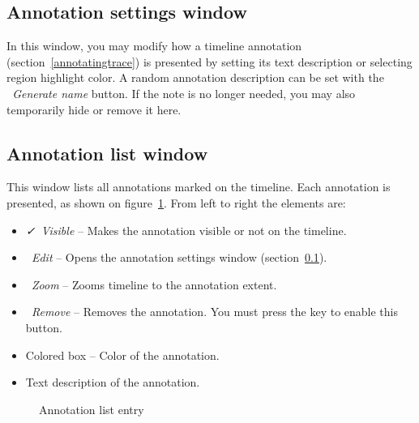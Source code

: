 \documentclass[hidelinks,titlepage,a4paper,twoside]{article}
\begin{document}
\subsection{Annotation settings window}
\label{annotationsettings}

In this window, you may modify how a timeline annotation (section~\ref{annotatingtrace}) is presented by setting its text description or selecting region highlight color. A random annotation description can be set with the \emph{\faDice{}~Generate name} button. If the note is no longer needed, you may also temporarily hide or remove it here.

\subsection{Annotation list window}
\label{annotationlist}

This window lists all annotations marked on the timeline. Each annotation is presented, as shown on figure~\ref{figannlist}. From left to right the elements are:

\begin{itemize}
\item \emph{\faCheck{}~Visible} -- Makes the annotation visible or not on the timeline.
\item \emph{\faPenToSquare{}~Edit} -- Opens the annotation settings window (section~\ref{annotationsettings}).
\item \emph{\faMicroscope{}~Zoom} -- Zooms timeline to the annotation extent.
\item \emph{\faTrashCan{}~Remove} -- Removes the annotation. You must press the \keys{\ctrl} key to enable this button.
\item Colored box -- Color of the annotation.
\item Text description of the annotation.
\end{itemize}

\begin{figure}[h]
\centering{}
\caption{Annotation list entry}
\label{figannlist}
\end{figure}
\end{document}
